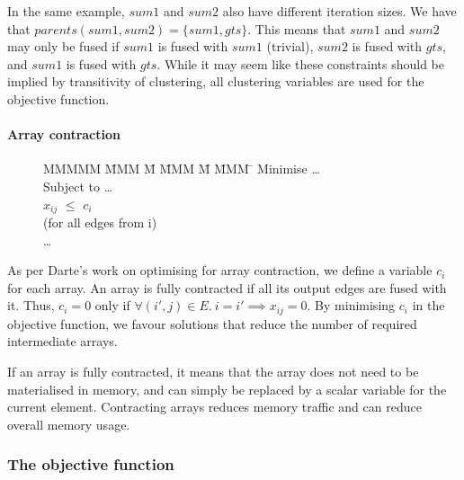 In the same example, $sum1$ and $sum2$ also have different iteration sizes.
We have that $parents(sum1,sum2) = \{sum1, gts\}$.
This means that $sum1$ and $sum2$ may only be fused if $sum1$ is fused with $sum1$ (trivial), $sum2$ is fused with $gts$, and $sum1$ is fused with $gts$.
While it may seem like these constraints should be implied by transitivity of clustering, all clustering variables are used for the objective function.


\paragraph{Array contraction}
\begin{figure}[H]
\begin{tabbing}
MMMMM   \= MMM \= M \= MMM \= M \= MMM \= \kill
Minimise   \> \ldots \\
Subject to \> \ldots \\
           \> $x_{ij}$    \> $\le$ \> $c_i$           \>       \>            \\
           \> (for all edges from i)            \\
           \> \ldots \\
\end{tabbing}
\end{figure}
As per Darte's work on optimising for array contraction\cite{darte2002contraction}, we define a variable $c_i$ for each array.
An array is fully contracted if all its output edges are fused with it.
Thus, $c_i=0$ only if $\forall (i',j) \in E.\ i = i' \implies x_{ij} = 0$.
By minimising $c_i$ in the objective function, we favour solutions that reduce the number of required intermediate arrays.

If an array is fully contracted, it means that the array does not need to be materialised in memory, and can simply be replaced by a scalar variable for the current element. Contracting arrays reduces memory traffic and can reduce overall memory usage.



\subsubsection{The objective function}
\label{s:ObjectiveFunction}

